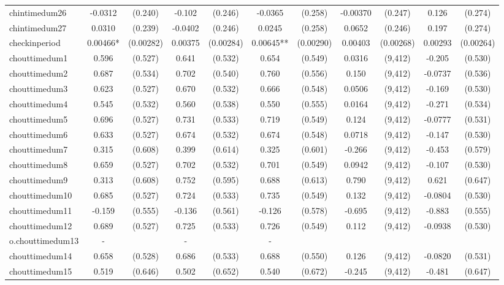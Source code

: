 \documentclass[]{article}
\begin{document}
\begin{tabular}{lcccccccccc}
chintimedum26 & -0.0312 & (0.240) & -0.102 & (0.246) & -0.0365 & (0.258) & -0.00370 & (0.247) & 0.126 & (0.274) \\
chintimedum27 & 0.0310 & (0.239) & -0.0402 & (0.246) & 0.0245 & (0.258) & 0.0652 & (0.246) & 0.197 & (0.274) \\
checkinperiod & 0.00466* & (0.00282) & 0.00375 & (0.00284) & 0.00645** & (0.00290) & 0.00403 & (0.00268) & 0.00293 & (0.00264) \\
chouttimedum1 & 0.596 & (0.527) & 0.641 & (0.532) & 0.654 & (0.549) & 0.0316 & (9,412) & -0.205 & (0.530) \\
chouttimedum2 & 0.687 & (0.534) & 0.702 & (0.540) & 0.760 & (0.556) & 0.150 & (9,412) & -0.0737 & (0.536) \\
chouttimedum3 & 0.623 & (0.527) & 0.670 & (0.532) & 0.666 & (0.548) & 0.0506 & (9,412) & -0.169 & (0.530) \\
chouttimedum4 & 0.545 & (0.532) & 0.560 & (0.538) & 0.550 & (0.555) & 0.0164 & (9,412) & -0.271 & (0.534) \\
chouttimedum5 & 0.696 & (0.527) & 0.731 & (0.533) & 0.719 & (0.549) & 0.124 & (9,412) & -0.0777 & (0.531) \\
chouttimedum6 & 0.633 & (0.527) & 0.674 & (0.532) & 0.674 & (0.548) & 0.0718 & (9,412) & -0.147 & (0.530) \\
chouttimedum7 & 0.315 & (0.608) & 0.399 & (0.614) & 0.325 & (0.601) & -0.266 & (9,412) & -0.453 & (0.579) \\
chouttimedum8 & 0.659 & (0.527) & 0.702 & (0.532) & 0.701 & (0.549) & 0.0942 & (9,412) & -0.107 & (0.530) \\
chouttimedum9 & 0.313 & (0.608) & 0.752 & (0.595) & 0.688 & (0.613) & 0.790 & (9,412) & 0.621 & (0.647) \\
chouttimedum10 & 0.685 & (0.527) & 0.724 & (0.533) & 0.735 & (0.549) & 0.132 & (9,412) & -0.0804 & (0.530) \\
chouttimedum11 & -0.159 & (0.555) & -0.136 & (0.561) & -0.126 & (0.578) & -0.695 & (9,412) & -0.883 & (0.555) \\
chouttimedum12 & 0.689 & (0.527) & 0.725 & (0.533) & 0.726 & (0.549) & 0.112 & (9,412) & -0.0938 & (0.530) \\
o.chouttimedum13 & - &  & - &  & - &  &  &  &  &  \\
chouttimedum14 & 0.658 & (0.528) & 0.686 & (0.533) & 0.688 & (0.550) & 0.126 & (9,412) & -0.0820 & (0.531) \\
chouttimedum15 & 0.519 & (0.646) & 0.502 & (0.652) & 0.540 & (0.672) & -0.245 & (9,412) & -0.481 & (0.647) \\

\end{tabular}
\end{document}
